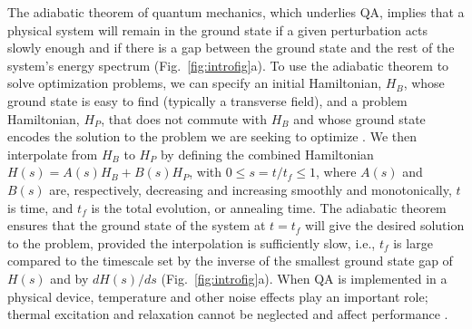 \documentclass[aps,pra,groupedaddress,nofootinbib,notitlepage,showpacs,floatfix,superscriptaddress]{revtex4-1}
\begin{document}
The adiabatic theorem of quantum mechanics, which underlies QA, implies that a physical system will remain in the ground state if a given perturbation acts slowly enough and if there is a gap between the ground state and the rest of the system's energy spectrum \cite{Kato:50} (Fig.~\ref{fig:introfig}a). To use the adiabatic theorem to solve optimization problems, we can specify an initial Hamiltonian, $H_B$, whose ground state is easy to find (typically a transverse field), and a problem Hamiltonian, $H_P$, that does not commute with $H_B$ and whose ground state encodes the solution to the problem we are seeking to optimize \cite{Farhi:00}. We then interpolate from $H_B$ to $H_P$ by defining the combined Hamiltonian $H(s) = A(s)H_B + B(s) H_P$, with $0\le s=t/t_f \le 1$, where $A(s)$ and $B(s)$ are, respectively, decreasing and increasing smoothly and monotonically, $t$ is time, and $t_f$ is the total evolution, or annealing time. The adiabatic theorem ensures that the ground state of the system at $t=t_f$ will give the desired solution to the problem, provided the interpolation is sufficiently slow, i.e., $t_f$ is large compared to the timescale set by the inverse of the smallest ground state gap of $H(s)$ and by $dH(s)/ds$ \cite{Jansen:07} (Fig.~\ref{fig:introfig}a). When QA is implemented in a physical device, temperature and other noise effects play an important role; thermal excitation and relaxation cannot be neglected and affect performance \cite{childs_robustness_2001,amin_decoherence_2009,Albash:2015nx}.
\end{document}
